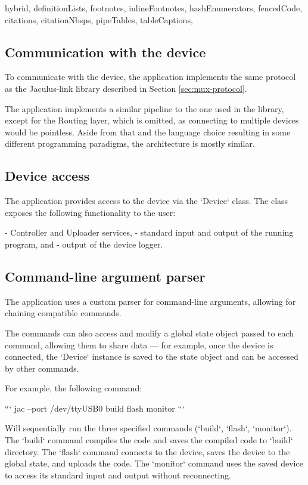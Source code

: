 \begin{markdown*}{%
  hybrid,
  definitionLists,
  footnotes,
  inlineFootnotes,
  hashEnumerators,
  fencedCode,
  citations,
  citationNbsps,
  pipeTables,
  tableCaptions,
}
\subsection{Communication with the device}

To communicate with the device, the application implements the same protocol as the Jaculus-link library described in Section \ref{sec:mux-protocol}.

The application implements a similar pipeline to the one used in the library, except for the Routing layer, which is omitted, as connecting to multiple devices would be pointless. Aside from that and the language choice resulting in some different programming paradigms, the architecture is mostly similar.

\subsection{Device access}

The application provides access to the device via the `Device` class. The class exposes the following functionality to the user:

  - Controller and Uploader services,
  - standard input and output of the running program, and
  - output of the device logger.

\subsection{Command-line argument parser}

The application uses a custom parser for command-line arguments, allowing for chaining compatible commands.

The commands can also access and modify a global state object passed to each command, allowing them to share data --- for example, once the device is connected, the `Device` instance is saved to the state object and can be accessed by other commands.

For example, the following command:

```
jac --port /dev/ttyUSB0 build flash monitor
```

Will sequentially run the three specified commands (`build`, `flash`, `monitor`). The `build` command compiles the code and saves the compiled code to `build` directory. The `flash` command connects to the device, saves the device to the global state, and uploads the code. The `monitor` command uses the saved device to access its standard input and output without reconnecting.


\end{markdown*}
